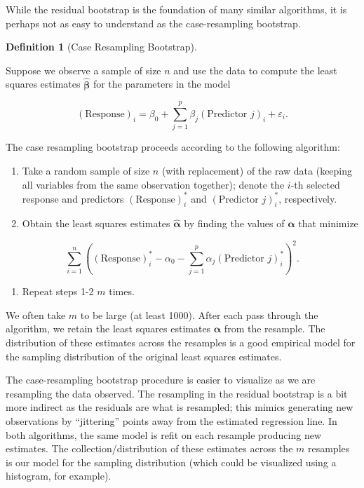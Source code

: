 \documentclass[
  letterpaper,
  DIV=11,
  numbers=noendperiod]{scrreprt}
\providecommand{\tightlist}{%
  \setlength{\itemsep}{0pt}\setlength{\parskip}{0pt}}\usepackage{longtable,booktabs,array}
\theoremstyle{definition}
\newtheorem{definition}{Definition}[chapter]
\theoremstyle{definition}
\theoremstyle{remark}
\begin{document}
While the residual bootstrap is the foundation of many similar
algorithms, it is perhaps not as easy to understand as the
case-resampling bootstrap.

\begin{definition}[Case Resampling
Bootstrap]\protect\hypertarget{def-case-resampling-bootstrap}{}\label{def-case-resampling-bootstrap}

Suppose we observe a sample of size \(n\) and use the data to compute
the least squares estimates \(\widehat{\boldsymbol{\beta}}\) for the
parameters in the model

\[(\text{Response})_i = \beta_0 + \sum_{j=1}^{p} \beta_j (\text{Predictor } j)_i + \varepsilon_i.\]

The case resampling bootstrap proceeds according to the following
algorithm:

\begin{enumerate}
\def\labelenumi{\arabic{enumi}.}
\tightlist
\item
  Take a random sample of size \(n\) (with replacement) of the raw data
  (keeping all variables from the same observation together); denote the
  \(i\)-th selected response and predictors \((\text{Response})_i^*\)
  and \((\text{Predictor } j)_i^*\), respectively.
\item
  Obtain the least squares estimates \(\widehat{\boldsymbol{\alpha}}\)
  by finding the values of \(\boldsymbol{\alpha}\) that minimize
\end{enumerate}

\[\sum_{i=1}^{n} \left((\text{Response})_i^* - \alpha_0 - \sum_{j=1}^{p} \alpha_j (\text{Predictor } j)_i^*\right)^2.\]

\begin{enumerate}
\def\labelenumi{\arabic{enumi}.}
\setcounter{enumi}{2}
\tightlist
\item
  Repeat steps 1-2 \(m\) times.
\end{enumerate}

We often take \(m\) to be large (at least 1000). After each pass through
the algorithm, we retain the least squares estimates
\(\widehat{\boldsymbol{\alpha}}\) from the resample. The distribution of
these estimates across the resamples is a good empirical model for the
sampling distribution of the original least squares estimates.

\end{definition}

The case-resampling bootstrap procedure is easier to visualize as we are
resampling the data observed. The resampling in the residual bootstrap
is a bit more indirect as the residuals are what is resampled; this
mimics generating new observations by ``jittering'' points away from the
estimated regression line. In both algorithms, the same model is refit
on each resample producing new estimates. The collection/distribution of
these estimates across the \(m\) resamples is our model for the sampling
distribution (which could be visualized using a histogram, for example).
\end{document}
